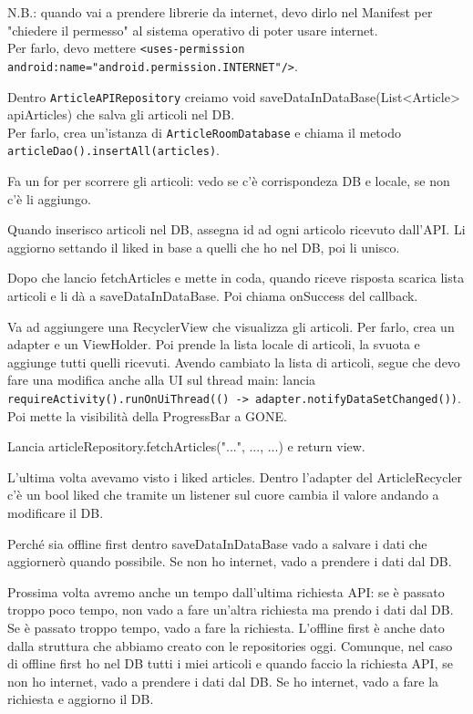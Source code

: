 \par N.B.: quando vai a prendere librerie da internet, devo dirlo nel Manifest per "chiedere il permesso" al sistema operativo di poter usare internet.\\
Per farlo, devo mettere \texttt{<uses-permission android:name="android.permission.INTERNET"/>}.
\par Dentro \texttt{ArticleAPIRepository} creiamo void saveDataInDataBase(List<Article> apiArticles) che salva gli articoli nel DB.\\
Per farlo, crea un'istanza di \texttt{ArticleRoomDatabase} e chiama il metodo \texttt{articleDao().insertAll(articles)}.
\par Fa un for per scorrere gli articoli: vedo se c'è corrispondeza DB e locale, se non c'è li aggiungo.
\par Quando inserisco articoli nel DB, assegna id ad ogni articolo ricevuto dall'API. Li aggiorno settando il liked in base a quelli che ho nel DB, poi li unisco.
\par Dopo che lancio fetchArticles e mette in coda, quando riceve risposta scarica lista articoli e li dà a saveDataInDataBase. Poi chiama onSuccess del callback.
\par Va ad aggiungere una RecyclerView che visualizza gli articoli. Per farlo, crea un adapter e un ViewHolder. Poi prende la lista locale di articoli, la svuota e aggiunge tutti quelli ricevuti. Avendo cambiato la lista di articoli, segue che devo fare una modifica anche alla UI sul thread main: lancia \texttt{requireActivity().runOnUiThread(() -> adapter.notifyDataSetChanged())}. Poi mette la visibilità della ProgressBar a GONE. 
\par Lancia articleRepository.fetchArticles("...", ..., ...) e return view.
\par L'ultima volta avevamo visto i liked articles. Dentro l'adapter del ArticleRecycler c'è un bool liked che tramite un listener sul cuore cambia il valore andando a modificare il DB.
\par Perché sia offline first dentro saveDataInDataBase vado a salvare i dati che aggiornerò quando possibile. Se non ho internet, vado a prendere i dati dal DB.
\par Prossima volta avremo anche un tempo dall'ultima richiesta API: se è passato troppo poco tempo, non vado a fare un'altra richiesta ma prendo i dati dal DB. Se è passato troppo tempo, vado a fare la richiesta. L'offline first è anche dato dalla struttura che abbiamo creato con le repositories oggi. Comunque, nel caso di offline first ho nel DB tutti i miei articoli e quando faccio la richiesta API, se non ho internet, vado a prendere i dati dal DB. Se ho internet, vado a fare la richiesta e aggiorno il DB.
